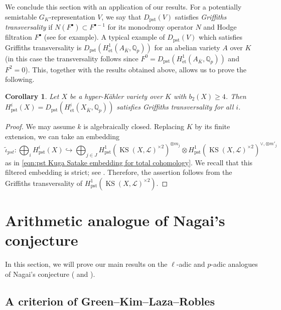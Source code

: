 \documentclass[12pt,reqno]{amsart}
\newtheorem{cor}[thm]{Corollary}
\theoremstyle{definition}
\newcommand{\Q}{{\mathds Q}}
\newcommand\KS{\mathop{\mathrm{KS}}\nolimits}
\newcommand{\et}{\mathrm{\acute{e}t}}
\newcommand{\scrL}{\mathscr{L}}
\DeclareMathOperator{\pst}{pst}
\numberwithin{equation}{section}
\begin{document}
We conclude this section with an application of our results.
For a potentially semistable
$G_K$-representation
$V$,
we say that $D_{\pst}(V)$
satisfies \emph{Griffiths transversality}
if $N(F^{\bullet}) \subset F^{\bullet-1}$
for its monodromy operator $N$ and Hodge filtration $F^\bullet$ (see \cite[Definition 1.3.1]{Paugam04a} for example).
A typical example of $D_{\pst}(V)$ which satisfies Griffiths transversality is 
$D_{\pst}(H^1_\et(A_{\overline{K}}, \Q_p))$
for an abelian variety $A$ over $K$ (in this case the transversality follows since $F^0=D_{\pst}(H^1_\et(A_{\overline{K}}, \Q_p))$ and $F^2=0$).
This, together with the results obtained above, allows us to prove the following.



\begin{cor}\label{cor:TransverseMonodromy}
Let $X$ be a hyper-Kähler variety over $K$ with $b_2(X) \geq 4$.
Then $H^i_{\pst}(X)=D_{\pst}(H^i_\et(X_{\overline{K}}, \Q_p))$ 
satisfies Griffiths transversality for all $i$.
\end{cor}
\begin{proof}
We may assume $k$ is algebraically closed.
Replacing $K$ by its finite extension,
we can take an embedding
\[
\widetilde{\iota}_{pst} \colon \bigoplus_i H^i_{\pst}(X) \hookrightarrow \bigoplus_{j \in J} H^1_{\pst} (\KS(X,\scrL)^{\times 2})^{\otimes m_j} \otimes H^1_{\pst} (\KS(X,\scrL)^{\times 2})^{\vee,\otimes m'_j}
\]
as in \eqref{eqn:pst Kuga Satake embedding for total cohomology}.
We recall that
this filtered embedding is strict; see \cite[Th\'eor\`eme 5.3.5]{Fontaine94III}.
Therefore, the assertion follows from the Griffiths transversality of $H^1_{\pst} (\KS(X,\scrL)^{\times 2})$.
\end{proof}








\section{Arithmetic analogue of Nagai's conjecture}\label{sec:ArithmeticNagaiConj}

In this section, we will prove our main results on the $\ell$-adic and $p$-adic analogues of Nagai's conjecture ( and ).




 \subsection{A criterion of Green--Kim--Laza--Robles}\label{Subsection:Green--Kim--Laza--Robles criterion}
\end{document}
